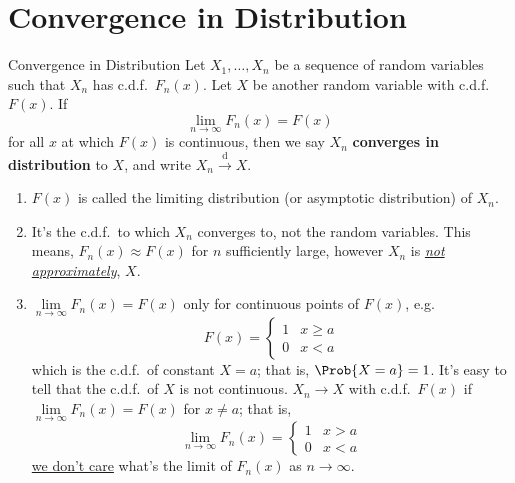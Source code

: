 \section{Convergence in Distribution}
\begin{Definition}{Convergence in Distribution}{}
    Let $ X_1,\ldots,X_n $ be a sequence of random variables
    such that $ X_n $ has c.d.f.\ $ F_n(x) $. Let $ X $
    be another random variable with c.d.f.\ $ F(x) $.
    If
    \[ \lim\limits_{{n} \to {\infty}} F_n(x)=F(x) \]
    for all $ x $ at which $ F(x) $ is continuous, then
    we say $ X_n $ \textbf{converges in distribution}
    to $ X $, and write $ X_n\stackrel{\text{d}}{\to} X $.
\end{Definition}
\begin{Remark}{}{}
    \begin{enumerate}[label=(\roman*)]
        \item $ F(x) $ is called the limiting distribution
              (or asymptotic distribution) of $ X_n $.
        \item It's the c.d.f.\ to which $ X_n $ converges to,
              not the random variables. This means,
              $ F_n(x)\approx F(x) $ for $ n $ sufficiently large,
              however $ X_n $ is \underline{\emph{not approximately}},
              $ X $.
        \item $ \lim\limits_{{n} \to {\infty}} F_n(x)=F(x) $
              only for continuous points of $ F(x) $, e.g.\
              \[ F(x)=\begin{cases}
                      1 & x\geqslant a \\
                      0 & x<a
                  \end{cases} \]
              which is the c.d.f.\
              of constant $ X=a $; that is,
              $ \Prob{X=a}=1 $. It's easy to tell that the
              c.d.f.\ of $ X $ is not continuous.
              $ X_n\to X $ with c.d.f.\ $ F(x) $ if
              $ \lim\limits_{{n} \to {\infty}} F_n(x)=F(x) $
              for $ x\neq a $; that is,
              \[ \lim\limits_{{n} \to {\infty}} F_n(x)=
                  \begin{cases}
                      1 & x>a \\
                      0 & x<a
                  \end{cases} \]
              \underline{we don't care} what's the limit of
              $ F_n(x) $ as $ n\to\infty $.
    \end{enumerate}
\end{Remark}
